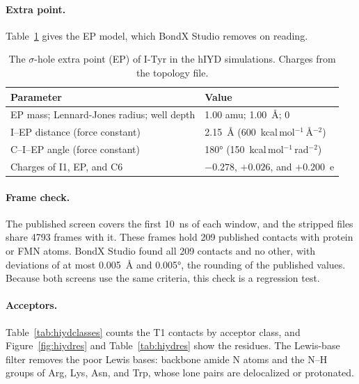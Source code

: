 \documentclass[journal=jcisd8,manuscript=suppinfo]{achemso}
\newcommand{\BX}{BondX Studio}
\begin{document}
\begin{singlespace}
\paragraph{Extra point.} Table~\ref{tab:ep} gives the EP model, which \BX{} removes on reading.

\begin{table}[!htbp]
\caption{The $\sigma$-hole extra point (EP) of I-Tyr in the hIYD simulations. Charges from the topology file.}
\label{tab:ep}
\centering\footnotesize
\begin{tabular}{ll}
\toprule
Parameter & Value \\
\midrule
EP mass; Lennard-Jones radius; well depth & 1.00 amu; \SI{1.00}{\angstrom}; 0 \\
I--EP distance (force constant) & \SI{2.15}{\angstrom} (600~kcal\,mol$^{-1}$\,\AA$^{-2}$) \\
C--I--EP angle (force constant) & \ang{180} (150~kcal\,mol$^{-1}$\,rad$^{-2}$) \\
Charges of I1, EP, and C6 & $-0.278$, $+0.026$, and $+0.200$~e \\
\bottomrule
\end{tabular}
\end{table}

\paragraph{Frame check.} The published screen covers the first 10~ns of each window, and the stripped files share 4793 frames with it. These frames hold 209 published contacts with protein or FMN atoms. \BX{} found all 209 contacts and no other, with deviations of at most \SI{0.005}{\angstrom} and \ang{0.005}, the rounding of the published values. Because both screens use the same criteria, this check is a regression test.

\paragraph{Acceptors.} Table~\ref{tab:hiydclasses} counts the T1 contacts by acceptor class, and Figure~\ref{fig:hiydres} and Table~\ref{tab:hiydres} show the residues. The Lewis-base filter removes the poor Lewis bases: backbone amide N atoms and the N--H groups of Arg, Lys, Asn, and Trp, whose lone pairs are delocalized or protonated.


\end{singlespace}
\end{document}
